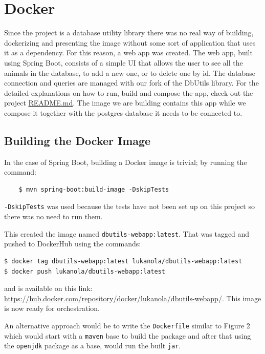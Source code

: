 \documentclass[sigconf]{acmart}
\begin{document}
\section{Docker}
Since the project is a database utility library there was no real way of building, dockerizing and presenting the image without some sort of application that uses it as a dependency. For this reason, a web app was created. The web app, built using Spring Boot, consists of a simple UI that allows the user to see all the animals in the database, to add a new one, or to delete one by id. The database connection and queries are managed with our fork of the DbUtils library. For the detailed explanations on how to run, build and compose the app, check out the project \href{https://github.com/Erasmus-In-Salerno/dbUtils-webapp}{README.md}. The image we are building contains this app while we compose it together with the postgres database it needs to be connected to.

\subsection*{Building the Docker Image}
In the case of Spring Boot, building a Docker image is trivial; by running the command:
\begin{verbatim}
    $ mvn spring-boot:build-image -DskipTests
\end{verbatim}

\texttt{-DskipTests} was used because the tests have not been set up on this project so there was no need to run them. 

This created the image named \texttt{dbutils-webapp:latest}. That was tagged and pushed to DockerHub using the commands:

\begin{lstlisting}
$ docker tag dbutils-webapp:latest lukanola/dbutils-webapp:latest
$ docker push lukanola/dbutils-webapp:latest
\end{lstlisting}

and is available on this link: \url{https://hub.docker.com/repository/docker/lukanola/dbutils-webapp/}. This image is now ready for orchestration.

An alternative approach would be to write the \texttt{Dockerfile} similar to Figure 2 which would start with a \texttt{maven} base to build the package and after that using the \texttt{openjdk} package as a base, would run the built \texttt{jar}.
\end{document}
